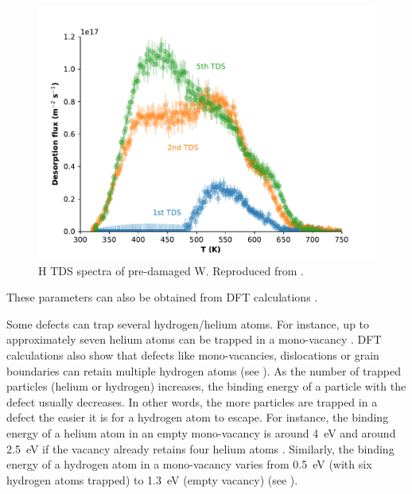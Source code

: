 \begin{figure} [h!]
    \centering
    \includegraphics[width=\linewidth]{Figures/Chapter1/tds_helium_nicolas.pdf}
    \caption{H TDS spectra of pre-damaged W. Reproduced from \cite{ialovega_hydrogen_2020}.}
\end{figure}

These parameters can also be obtained from DFT calculations .

Some defects can trap several hydrogen/helium atoms.
For instance, up to approximately seven helium atoms can be trapped in a mono-vacancy .
DFT calculations also show that defects like mono-vacancies, dislocations or grain boundaries can retain multiple hydrogen atoms (see ).
As the number of trapped particles (helium or hydrogen) increases, the binding energy of a particle with the defect usually decreases.
In other words, the more particles are trapped in a defect the easier it is for a hydrogen atom to escape.
For instance, the binding energy of a helium atom in an empty mono-vacancy is around \SI{4}{eV} and around \SI{2.5}{eV} if the vacancy already retains four helium atoms \cite{faney_spatially_2015}.
Similarly, the binding energy of a hydrogen atom in a mono-vacancy varies from \SI{0.5}{eV} (with six hydrogen atoms trapped) to \SI{1.3}{eV} (empty vacancy) (see ).

